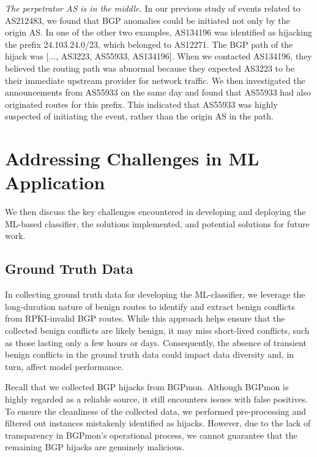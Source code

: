 \noindent\textit{The perpetrator AS is in the middle.}
In our previous study of events related to AS212483, we found that BGP anomalies could be initiated not only by the origin AS. In one of the other two examples, AS134196 was identified as hijacking the prefix 24.103.24.0/23, which belonged to AS12271. The BGP path of the hijack was [..., AS3223, AS55933, AS134196]. When we contacted AS134196, they believed the routing path was abnormal because they expected AS3223 to be their immediate upstream provider for network traffic. We then investigated the announcements from AS55933 on the same day and found that AS55933 had also originated routes for this prefix.
This indicated that AS55933 was highly suspected of initiating the event, rather than the origin AS in the path.



\section{Addressing Challenges in ML Application} \label{app:ml_challenges}
We then discuss the key challenges encountered in developing and deploying the ML-based classifier, the solutions implemented, and potential solutions for future work.

\subsection{Ground Truth Data}
In collecting ground truth data for developing the ML-classifier, we leverage the long-duration nature of benign routes to identify and extract benign conflicts from RPKI-invalid BGP routes. While this approach helps ensure that the collected benign conflicts are likely benign, it may miss short-lived conflicts, such as those lasting only a few hours or days. Consequently, the absence of transient benign conflicts in the ground truth data could impact data diversity and, in turn, affect model performance.

Recall that we collected BGP hijacks from BGPmon. Although BGPmon is highly regarded as a reliable source, it still encounters issues with false positives. To ensure the cleanliness of the collected data, we performed pre-processing and filtered out instances mistakenly identified as hijacks. However, due to the lack of transparency in BGPmon’s operational process, we cannot guarantee that the remaining BGP hijacks are genuinely malicious.


